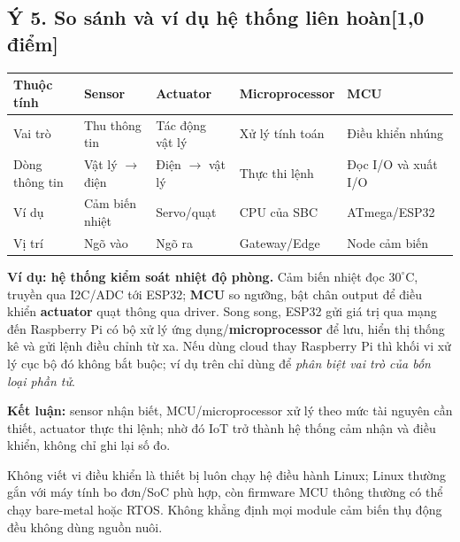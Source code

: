 \documentclass[12pt,a4paper]{article}
\newcommand{\muc}[1]{\subsection*{#1\hfill{\color{teal}\normalsize [1,0 điểm]}}}
\begin{document}
\muc{Ý 5. So sánh và ví dụ hệ thống liên hoàn}
\begin{center}\small
\begin{tabularx}{\linewidth}{p{2.4cm}XXXX}
\toprule
Thuộc tính & Sensor & Actuator & Microprocessor & MCU\\
\midrule
Vai trò & Thu thông tin & Tác động vật lý & Xử lý tính toán & Điều khiển nhúng\\
Dòng thông tin & Vật lý $\to$ điện & Điện $\to$ vật lý & Thực thi lệnh & Đọc I/O và xuất I/O\\
Ví dụ & Cảm biến nhiệt & Servo/quạt & CPU của SBC & ATmega/ESP32\\
Vị trí & Ngõ vào & Ngõ ra & Gateway/Edge & Node cảm biến\\
\bottomrule
\end{tabularx}
\end{center}
\textbf{Ví dụ: hệ thống kiểm soát nhiệt độ phòng.} Cảm biến nhiệt đọc $30^\circ$C, truyền qua I2C/ADC tới ESP32; \textbf{MCU} so ngưỡng, bật chân output để điều khiển \textbf{actuator} quạt thông qua driver. Song song, ESP32 gửi giá trị qua mạng đến Raspberry Pi có bộ xử lý ứng dụng/\textbf{microprocessor} để lưu, hiển thị thống kê và gửi lệnh điều chỉnh từ xa. Nếu dùng cloud thay Raspberry Pi thì khối vi xử lý cục bộ đó không bắt buộc; ví dụ trên chỉ dùng để \emph{phân biệt vai trò của bốn loại phần tử}.

\textbf{Kết luận:} sensor nhận biết, MCU/microprocessor xử lý theo mức tài nguyên cần thiết, actuator thực thi lệnh; nhờ đó IoT trở thành hệ thống cảm nhận và điều khiển, không chỉ ghi lại số đo.
\begin{luuy}
Không viết vi điều khiển là thiết bị luôn chạy hệ điều hành Linux; Linux thường gắn với máy tính bo đơn/SoC phù hợp, còn firmware MCU thông thường có thể chạy bare-metal hoặc RTOS. Không khẳng định mọi module cảm biến thụ động đều không dùng nguồn nuôi.
\end{luuy}

\newpage
\end{document}
